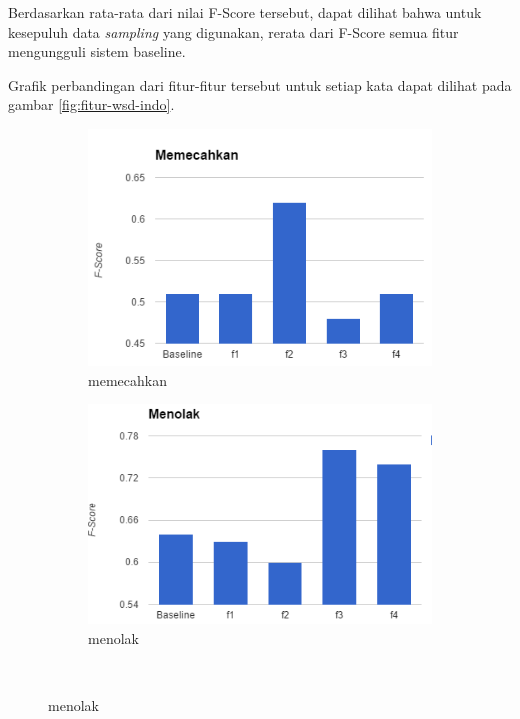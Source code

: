 Berdasarkan rata-rata dari nilai F-Score tersebut, dapat dilihat bahwa untuk kesepuluh data \textit{sampling} yang digunakan, rerata dari F-Score semua fitur mengungguli sistem baseline.

Grafik perbandingan dari fitur-fitur tersebut untuk setiap kata dapat dilihat pada gambar \ref{fig:fitur-wsd-indo}.

\begin{figure}[H]
	\begin{subfigure}{.5\textwidth}
		\centering
		\includegraphics[width=1\linewidth]{adit_pics/memecahkan.png}
		\caption{memecahkan}
	\end{subfigure}%
	\begin{subfigure}{.5\textwidth}
		\centering
		\includegraphics[width=1\linewidth]{adit_pics/menolak.png}
		\caption{menolak}
	\end{subfigure}%
	\\

\end{figure}
